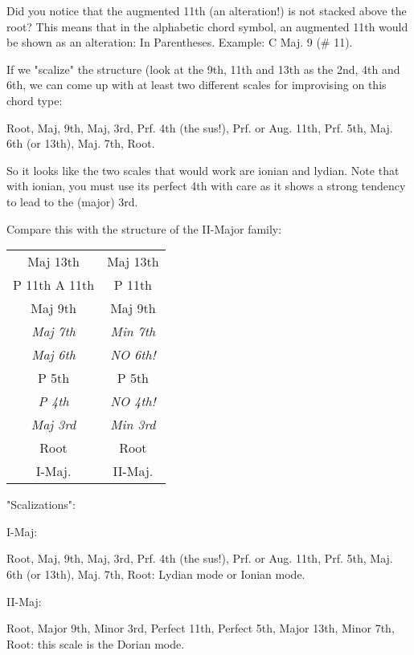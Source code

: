 Did you notice that the augmented 11th (an alteration!) is not stacked 
above the root? This means that in the alphabetic chord symbol, an 
augmented 11th would be shown as an alteration: In Parentheses. Example:
C Maj. 9 (\# 11).

If we "scalize" the structure (look at the 9th, 11th and 13th as the 2nd, 
4th and 6th, we can come up with at least two different scales for 
improvising on this chord type:

Root, Maj, 9th, Maj, 3rd, Prf. 4th (the sus!), Prf. or Aug. 11th, 
Prf. 5th, Maj. 6th (or 13th), Maj. 7th, Root.

So it looks like the two scales that would work are ionian and lydian. 
Note that with ionian, you must use its perfect 4th with care as it shows 
a strong tendency to lead to the (major) 3rd.

Compare this with the structure of the II-Major family:

\begin{tabular}{ c | c }
	Maj 13th					& Maj 13th				\\
	P 11th   A 11th   & P 11th					\\
	Maj 9th           & Maj 9th					\\
	\emph{Maj 7th}    & \emph{Min 7th}	\\
	\emph{Maj 6th}		& \emph{NO 6th!}	\\
	P 5th             & P 5th						\\
	\emph{P 4th}			& \emph{NO 4th!}	\\
	\emph{Maj 3rd}		& \emph{Min 3rd}	\\
	Root              & Root						\\
	\hline
  I-Maj.            & II-Maj.\\
\end{tabular}

"Scalizations":

I-Maj:

Root, Maj, 9th, Maj, 3rd, Prf. 4th (the sus!), Prf. or Aug. 11th, 
Prf. 5th, Maj. 6th (or 13th), Maj. 7th, Root: Lydian mode or Ionian mode.

II-Maj:

Root, Major 9th, Minor 3rd, Perfect 11th, Perfect 5th, 
Major 13th, Minor 7th, Root: this scale is the Dorian mode.


